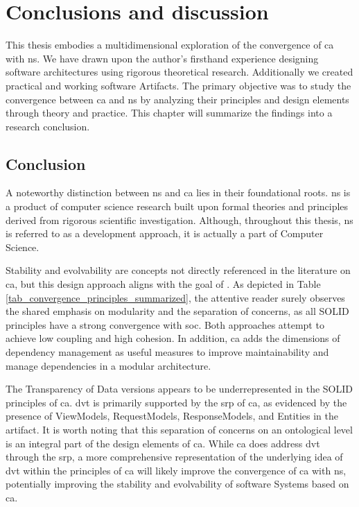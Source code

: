 \chapter{Conclusions and discussion} \label{chap_conclusions}

This thesis embodies a multidimensional exploration of the convergence of \gls{ca} with
\gls{ns}. We have drawn upon the author's firsthand experience designing software
architectures using rigorous theoretical research. Additionally we created practical and
working software Artifacts. The primary objective was to study the convergence between
\gls{ca} and \gls{ns} by analyzing their principles and design elements through theory
and practice. This chapter will summarize the findings into a research conclusion.

\section{Conclusion}

A noteworthy distinction between \gls{ns} and \gls{ca} lies in their foundational roots.
\gls{ns} is a product of computer science research built upon formal theories and
principles derived from rigorous scientific investigation. Although, throughout this
thesis, \gls{ns} is referred to as a development approach, it is actually a part of
Computer Science.

Stability and evolvability are concepts not directly referenced in the literature on
\gls{ca}, but this design approach aligns with the goal of
\textcite[31]{mannaert_normalized_2016}. As depicted in Table
\ref{tab_convergence_principles_summarized}, the attentive reader surely observes the
shared emphasis on modularity and the separation of concerns, as all SOLID principles have
a strong convergence with \gls{soc}. Both approaches attempt to achieve low coupling and
high cohesion. In addition, \gls{ca} adds the dimensions of dependency management as
useful measures to improve maintainability and manage dependencies in a modular
architecture.

The Transparency of Data versions appears to be underrepresented in the SOLID principles
of \gls{ca}. \gls{dvt} is primarily supported by the \gls{srp} of \gls{ca}, as evidenced
by the presence of ViewModels, RequestModels, ResponseModels, and Entities in the
artifact. It is worth noting that this separation of concerns on an ontological level is an
integral part of the design elements of \gls{ca}. While \gls{ca} does address \gls{dvt}
through the \gls{srp}, a more comprehensive representation of the underlying idea of
\gls{dvt} within the principles of \gls{ca} will likely improve the convergence of
\gls{ca} with \gls{ns}, potentially improving the stability and evolvability of software
Systems based on \gls{ca}.


